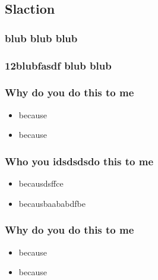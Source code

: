 \documentclass{beamer}
\begin{document}
        \subsection{Slaction}
            \begin{frame}
                \frametitle{blub blub blub}
            \end{frame}
            \begin{frame}
                \frametitle{12blubfasdf blub blub}
            \end{frame}
        \begin{frame}
            \frametitle{Why do you do this to me}
            \begin{itemize}
                \item because
                \item because
            \end{itemize}
        \end{frame}
        \begin{frame}
            \frametitle{Who you idsdsdsdo this to me}
            \begin{itemize}
                \item becausdsffce
                \item becausbaababdfbe
            \end{itemize}
        \end{frame}
        \begin{frame}
            \frametitle{Why do you do this to me}
            \begin{itemize}
                \item because
                \item because
            \end{itemize}
        \end{frame}
\end{document}

